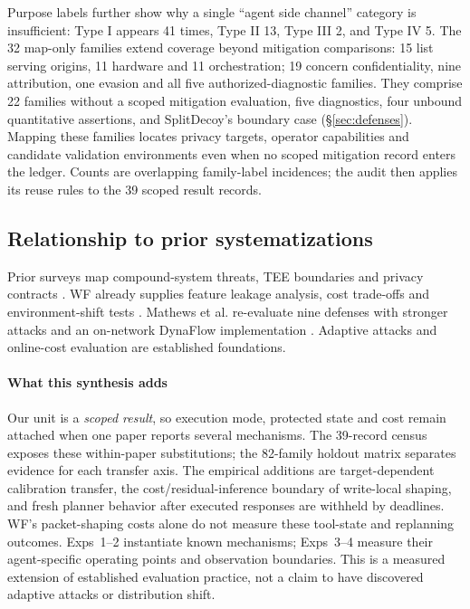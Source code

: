 Purpose labels further show why a single “agent side channel” category is insufficient: Type I appears 41 times, Type II 13, Type III 2, and Type IV 5. The 32 map-only families extend coverage beyond mitigation comparisons: 15 list serving origins, 11 hardware and 11 orchestration; 19 concern confidentiality, nine attribution, one evasion and all five authorized-diagnostic families. They comprise 22 families without a scoped mitigation evaluation, five diagnostics, four unbound quantitative assertions, and SplitDecoy's boundary case (\S\ref{sec:defenses}). Mapping these families locates privacy targets, operator capabilities and candidate validation environments even when no scoped mitigation record enters the ledger. Counts are overlapping family-label incidences; the audit then applies its reuse rules to the 39 scoped result records.

\subsection{Relationship to prior systematizations}
Prior surveys map compound-system threats, TEE boundaries and privacy contracts \cite{banerjee2024compound,forough2026secrets,kotevska2026privacyfoundations}. WF already supplies feature leakage analysis, cost trade-offs and environment-shift tests \cite{cai2014systematic,juarez2014critical,juarez2016wtfpad,wang2017walkietalkie}. Mathews et al. re-evaluate nine defenses with stronger attacks and an on-network DynaFlow implementation \cite{mathews2023critical}. Adaptive attacks and online-cost evaluation are established foundations.

\paragraph{What this synthesis adds}
Our unit is a \emph{scoped result}, so execution mode, protected state and cost remain attached when one paper reports several mechanisms. The 39-record census exposes these within-paper substitutions; the 82-family holdout matrix separates evidence for each transfer axis. The empirical additions are target-dependent calibration transfer, the cost/residual-inference boundary of write-local shaping, and fresh planner behavior after executed responses are withheld by deadlines. WF's packet-shaping costs alone do not measure these tool-state and replanning outcomes. Exps~1--2 instantiate known mechanisms; Exps~3--4 measure their agent-specific operating points and observation boundaries. This is a measured extension of established evaluation practice, not a claim to have discovered adaptive attacks or distribution shift.
